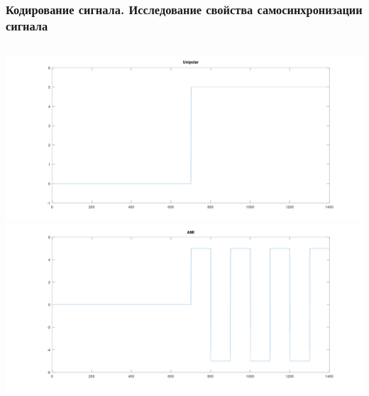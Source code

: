\begin{frame}
\frametitle{Кодирование сигнала. Исследование свойства самосинхронизации сигнала}
\begin{columns}
            \includegraphics[width=\textwidth]{../octave/coding/sync/unipolar.png}
            \includegraphics[width=\textwidth]{../octave/coding/sync/ami.png}
\end{columns}
\end{frame}

